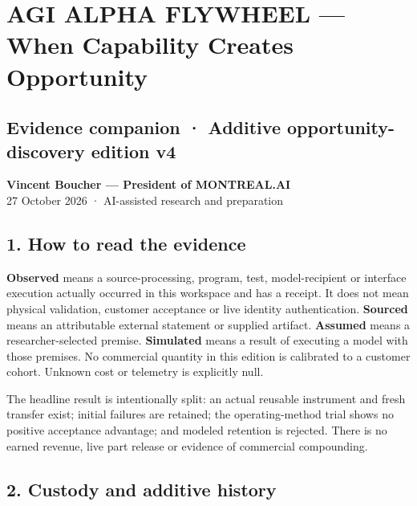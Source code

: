 \documentclass[
  10pt,
]{article}
\author{}
\date{}
\let\OriginalSection\section
\renewcommand{\section}{\needspace{5\baselineskip}\OriginalSection}
\let\OriginalSubsection\subsection
\renewcommand{\subsection}{\needspace{6\baselineskip}\OriginalSubsection}
\begin{document}
\hypertarget{agi-alpha-flywheel-when-capability-creates-opportunity}{%
\section{AGI ALPHA FLYWHEEL --- When Capability Creates
Opportunity}\label{agi-alpha-flywheel-when-capability-creates-opportunity}}

\hypertarget{evidence-companion-additive-opportunity-discovery-edition-v4}{%
\subsection{Evidence companion · Additive opportunity-discovery edition
v4}\label{evidence-companion-additive-opportunity-discovery-edition-v4}}

\textbf{Vincent Boucher --- President of MONTREAL.AI}\\
27 October 2026 · AI-assisted research and preparation

\hypertarget{how-to-read-the-evidence}{%
\subsection{1. How to read the
evidence}\label{how-to-read-the-evidence}}

\textbf{Observed} means a source-processing, program, test,
model-recipient or interface execution actually occurred in this
workspace and has a receipt. It does not mean physical validation,
customer acceptance or live identity authentication. \textbf{Sourced}
means an attributable external statement or supplied artifact.
\textbf{Assumed} means a researcher-selected premise. \textbf{Simulated}
means a result of executing a model with those premises. No commercial
quantity in this edition is calibrated to a customer cohort. Unknown
cost or telemetry is explicitly null.

The headline result is intentionally split: an actual reusable
instrument and fresh transfer exist; initial failures are retained; the
operating-method trial shows no positive acceptance advantage; and
modeled retention is rejected. There is no earned revenue, live part
release or evidence of commercial compounding.

\hypertarget{custody-and-additive-history}{%
\subsection{2. Custody and additive
history}\label{custody-and-additive-history}}
\end{document}
